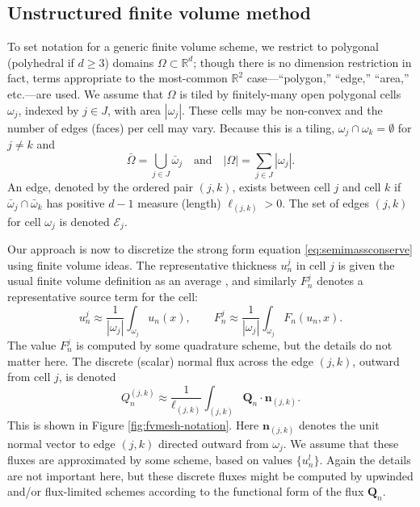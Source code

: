 \documentclass[final,leqno,onefignum,onetabnum]{siamltex1213bueler}
\newcommand\bn{\mathbf{n}}
\newcommand\bQ{\mathbf{Q}}
\newcommand\RR{\mathbb{R}}
\begin{document}
\subsection{Unstructured finite volume method} \label{subsec:spacenotation}  To set notation for a generic finite volume scheme, we restrict to polygonal (polyhedral if $d\ge 3$) domains $\Omega\subset \RR^d$; though there is no dimension restriction in fact, terms appropriate to the most-common $\RR^2$ case---``polygon,'' ``edge,'' ``area,'' etc.---are used.  We assume that $\Omega$ is tiled by finitely-many open polygonal cells $\omega_j$, indexed by $j\in J$, with area $|\omega_j|$.  These cells may be non-convex and the number of edges (faces) per cell may vary.  Because this is a tiling, $\omega_j \cap \omega_k = \emptyset$ for $j\ne k$ and
\begin{equation}
\bar\Omega = \bigcup_{j\in J} \bar \omega_j \quad \text{and} \quad |\Omega| = \sum_{j\in J} |\omega_j|.  \label{eq:tiling}
\end{equation}
An edge, denoted by the ordered pair $(j,k)$, exists between cell $j$ and cell $k$ if $\bar\omega_j \cap \bar \omega_k$ has positive $d-1$ measure (length) $\ell_{(j,k)}>0$.  The set of edges $(j,k)$ for cell $\omega_j$ is denoted $\mathcal{E}_j$.

Our approach is now to discretize the strong form equation \eqref{eq:semimassconserve} using finite volume ideas.  The representative thickness $u_n^j$ in cell $j$ is given the usual finite volume definition as an average \cite{LeVeque2002}, and similarly $F_n^j$ denotes a representative source term for the cell:
\begin{equation}
u_n^j \approx \frac{1}{|\omega_j|} \int_{\omega_j} u_n(x), \qquad F_n^j \approx \frac{1}{|\omega_j|} \int_{\omega_j} F_n(u_n,x).  \label{eq:fvthickness}
\end{equation}
The value $F_n^j$ is computed by some quadrature scheme, but the details do not matter here.  The discrete (scalar) normal flux across the edge $(j,k)$, outward from cell $j$, is denoted
\begin{equation}
Q_n^{(j,k)} \approx \frac{1}{\ell_{(j,k)}} \int_{(j,k)} \bQ_n \cdot \bn_{(j,k)}. \label{eq:fvflux}
\end{equation}
This is shown in Figure \ref{fig:fvmesh-notation}.  Here $\bn_{(j,k)}$ denotes the unit normal vector to edge $(j,k)$ directed outward from $\omega_j$.  We assume that these fluxes are approximated by some scheme, based on values $\{u_n^l\}$.  Again the details are not important here, but these discrete fluxes might be computed by upwinded and/or flux-limited schemes \cite{LeVeque2002} according to the functional form of the flux $\bQ_n$.
\end{document}
